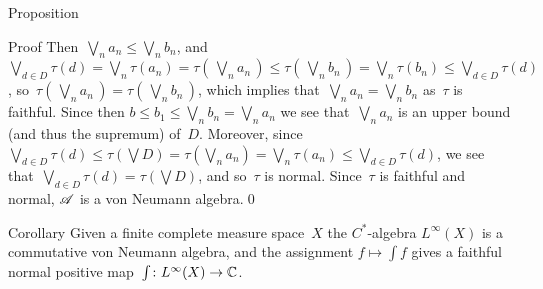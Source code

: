 \documentclass[a]{subfiles}
\begin{document}
\begin{parsec}
\begin{point}{Proposition}
\begin{point}{Proof}
Then~$\bigvee_n a_n \leq \bigvee_n b_n$,
and~$\bigvee_{d\in D} \tau(d) =\bigvee_n \tau(a_n)
=\tau(\,\bigvee_n a_n\,)
\leq \tau(\,\bigvee_n b_n\,)
= \bigvee_n \tau(b_n) \leq \bigvee_{d\in D} \tau(d)$,
so~$\tau(\,\bigvee_n a_n\,) = \tau(\,\bigvee_n b_n\,)$,
which implies that~$\bigvee_n a_n = \bigvee_n b_n$
as~$\tau$ is faithful.
Since then $b\leq b_1\leq \bigvee_n b_n = \bigvee_n a_n$
we see that~$\bigvee_n a_n$ is an upper bound
(and thus the supremum) of~$D$.
Moreover,
since
$\bigvee_{d\in D} \tau(d) \leq
\tau(\bigvee D)
=\tau(\bigvee_n a_n)
=\bigvee_n\tau(a_n)
\leq \bigvee_{d\in D} \tau(d)$,
we see that~$\bigvee_{d\in D} \tau(d)
= \tau(\bigvee D)$,
and so~$\tau$ is normal.
Since~$\tau$ is faithful
and normal, $\mathscr{A}$ is a von Neumann algebra.\qed
\end{point}
\end{point}
\begin{point}[Linfty-vn]{Corollary}%
Given a finite complete measure space~$X$ 
the $C^*$-algebra $L^\infty(X)$
is a commutative von Neumann algebra,
and the assignment $f\mapsto \int f$
gives a faithful normal positive
map~$\int\colon L^\infty(X)\to\mathbb{C}$.
\end{point}
\end{parsec}
\end{document}
